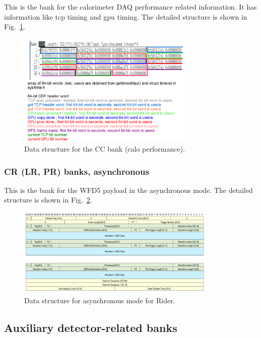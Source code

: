 This is the bank for the calorimeter DAQ performance related information.
It has information like tcp timing and gpu timing. The detailed structure is shown in Fig.~\ref{fig:CCBankFormat}.

\begin{figure}[htbp]
\centering
\includegraphics[width=0.75\textwidth]{pics/CCBankFormat.pdf} 
\caption{Data structure for the CC bank (calo performance).}\label{fig:CCBankFormat}
\end{figure}

\subsubsection*{CR (LR, PR) banks, asynchronous}

This is the bank for the WFD5 payload in the asynchronous mode. The detailed structure is shown in Fig.~\ref{fig:AsyncRiderData}.

\begin{figure}[htbp]
\centering
\includegraphics[width=0.85\textwidth]{pics/AsyncRiderData.pdf} 
\caption{Data structure for asynchronous mode for Rider.}\label{fig:AsyncRiderData}
\end{figure}

\subsection{Auxiliary detector-related banks}

